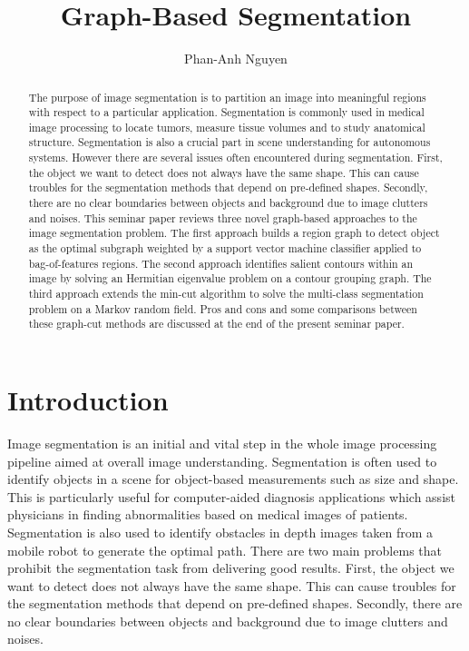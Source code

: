 \documentclass{SMBV12}
\begin{document}
\title{Graph-Based Segmentation}

\author{Phan-Anh Nguyen}

\maketitle


\begin{abstract}%
The purpose of image segmentation is to partition an image into meaningful regions with respect to a particular application. Segmentation is commonly used in medical image processing to locate tumors, measure tissue volumes and to study anatomical structure. Segmentation is also a crucial part in scene understanding for autonomous systems. However there are several issues often encountered during segmentation. First, the object we want to detect does not always have the same shape. This can cause troubles for the segmentation methods that depend on pre-defined shapes. Secondly, there are no clear boundaries between objects and background due to image clutters and noises. This seminar paper reviews three novel graph-based approaches to the image segmentation problem. The first approach builds a region graph to detect object as the optimal subgraph weighted by a support vector machine classifier applied to bag-of-features regions. The second approach identifies salient contours within an image by solving an Hermitian eigenvalue problem on a contour grouping graph. The third approach extends the min-cut algorithm to solve the multi-class segmentation problem on a Markov random field. Pros and cons and some comparisons between these graph-cut methods are discussed at the end of the present seminar paper.
\end{abstract}



%
\section{Introduction}

Image segmentation is an initial and vital step in the whole image processing pipeline aimed at overall image understanding. Segmentation is often used to identify objects in a scene for object-based measurements such as size and shape. This is particularly useful for computer-aided diagnosis applications which assist physicians in finding abnormalities based on medical images of patients. Segmentation is also used to identify obstacles in depth images taken from a mobile robot to generate the optimal path. There are two main problems that prohibit the segmentation task from delivering good results. First, the object we want to detect does not always have the same shape. This can cause troubles for the segmentation methods that depend on pre-defined shapes. Secondly, there are no clear boundaries between objects and background due to image clutters and noises.
\end{document}

